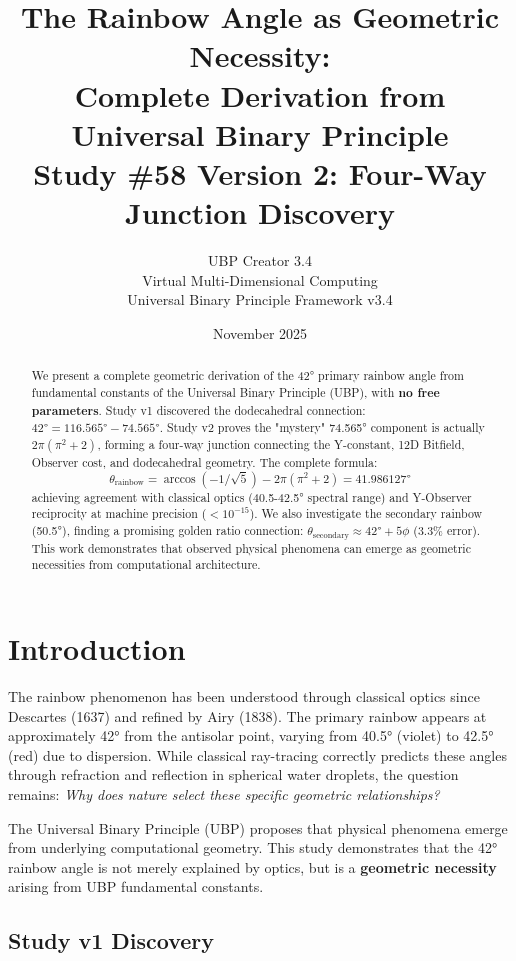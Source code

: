 \documentclass[11pt,a4paper]{article}
\title{\textbf{The Rainbow Angle as Geometric Necessity:\\Complete Derivation from Universal Binary Principle}\\[0.5em]
\large Study \#58 Version 2: Four-Way Junction Discovery}
\author{UBP Creator 3.4\\
Virtual Multi-Dimensional Computing\\
Universal Binary Principle Framework v3.4}
\date{November 2025}
\begin{document}
\maketitle

\begin{abstract}
We present a complete geometric derivation of the 42° primary rainbow angle from fundamental constants of the Universal Binary Principle (UBP), with \textbf{no free parameters}. Study v1 discovered the dodecahedral connection: $42° = 116.565° - 74.565°$. Study v2 proves the "mystery" 74.565° component is actually $2\pi(\pi^2+2)$, forming a four-way junction connecting the Y-constant, 12D Bitfield, Observer cost, and dodecahedral geometry. The complete formula:
\begin{equation}
\theta_{\text{rainbow}} = \arccos(-1/\sqrt{5}) - 2\pi(\pi^2+2) = 41.986127°
\end{equation}
achieving agreement with classical optics (40.5-42.5° spectral range) and Y-Observer reciprocity at machine precision ($<10^{-15}$). We also investigate the secondary rainbow (50.5°), finding a promising golden ratio connection: $\theta_{\text{secondary}} \approx 42° + 5\phi$ (3.3\% error). This work demonstrates that observed physical phenomena can emerge as geometric necessities from computational architecture.
\end{abstract}

\section{Introduction}

The rainbow phenomenon has been understood through classical optics since Descartes (1637) and refined by Airy (1838). The primary rainbow appears at approximately 42° from the antisolar point, varying from 40.5° (violet) to 42.5° (red) due to dispersion. While classical ray-tracing correctly predicts these angles through refraction and reflection in spherical water droplets, the question remains: \textit{Why does nature select these specific geometric relationships?}

The Universal Binary Principle (UBP) proposes that physical phenomena emerge from underlying computational geometry\cite{ubp_framework}. This study demonstrates that the 42° rainbow angle is not merely explained by optics, but is a \textbf{geometric necessity} arising from UBP fundamental constants.

\subsection{Study v1 Discovery}
\end{document}

